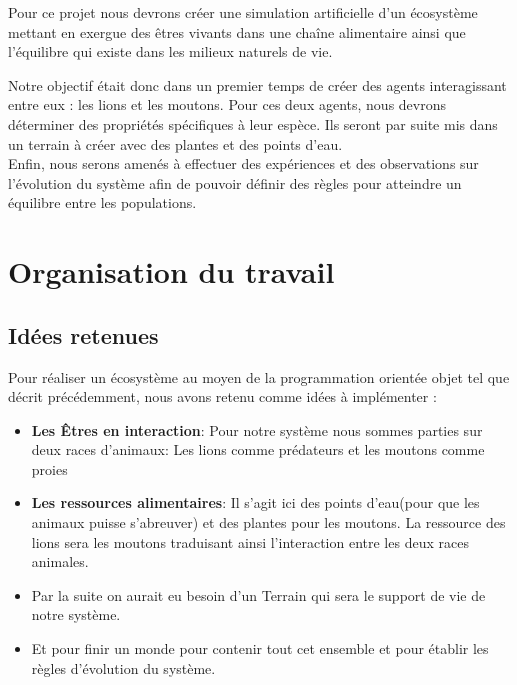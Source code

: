 \documentclass[a4paper,12pt]{article} %
\begin{document}
Pour ce projet nous devrons créer une simulation artificielle d'un écosystème mettant en exergue des êtres vivants dans une chaîne alimentaire ainsi que l'équilibre qui existe dans les milieux naturels de vie.

Notre objectif était donc dans un premier temps de créer des agents interagissant entre eux : les lions et les moutons.
Pour ces deux agents, nous devrons déterminer des propriétés spécifiques à leur espèce. Ils seront par suite mis dans un terrain à créer avec des plantes et des points d'eau.\\

Enfin, nous serons amenés à effectuer des expériences et des observations sur l'évolution du système afin de pouvoir définir des règles pour atteindre un équilibre entre les populations.


\section{Organisation du travail}
\subsection{Idées retenues}
Pour réaliser un écosystème au moyen de la programmation orientée objet tel que décrit précédemment, nous avons retenu comme idées à implémenter :
\begin{itemize}
    \item \textbf{Les Êtres en interaction}: Pour notre système nous sommes parties sur deux races d'animaux: Les lions comme prédateurs et les moutons comme proies
    \item \textbf{Les ressources alimentaires}: Il s'agit ici des points d'eau(pour que les animaux puisse s'abreuver) et des plantes pour les moutons. La ressource des lions sera les moutons traduisant ainsi l'interaction entre les deux races animales.
    \item Par la suite on aurait eu besoin d'un Terrain qui sera le support de vie de notre système.
    \item Et pour finir un monde pour contenir tout cet ensemble et pour établir les règles d'évolution du système.
\end{itemize}
\end{document}

